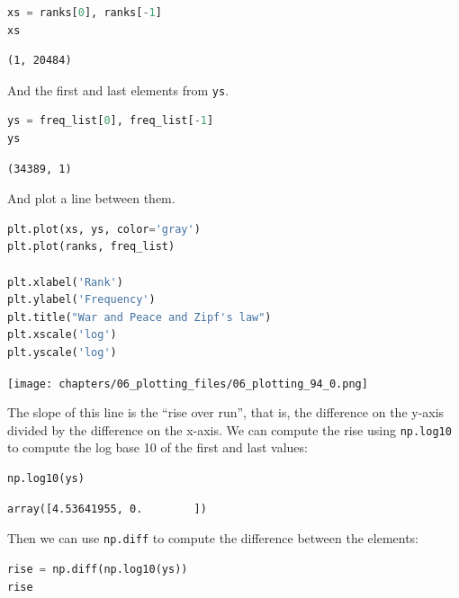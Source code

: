 \begin{lstlisting}[language=Python,style=source]
xs = ranks[0], ranks[-1]
xs
\end{lstlisting}

\begin{lstlisting}[style=output]
(1, 20484)
\end{lstlisting}

And the first and last elements from \passthrough{\lstinline!ys!}.

\begin{lstlisting}[language=Python,style=source]
ys = freq_list[0], freq_list[-1]
ys
\end{lstlisting}

\begin{lstlisting}[style=output]
(34389, 1)
\end{lstlisting}

And plot a line between them.

\begin{lstlisting}[language=Python,style=source]
plt.plot(xs, ys, color='gray')
plt.plot(ranks, freq_list)

plt.xlabel('Rank')
plt.ylabel('Frequency')
plt.title("War and Peace and Zipf's law")
plt.xscale('log')
plt.yscale('log')
\end{lstlisting}

\begin{center}
\texttt{[image: chapters/06\_plotting\_files/06\_plotting\_94\_0.png]}
\end{center}

The slope of this line is the ``rise over run'', that is, the difference
on the y-axis divided by the difference on the x-axis. We can compute
the rise using \passthrough{\lstinline!np.log10!} to compute the log
base 10 of the first and last values:

\begin{lstlisting}[language=Python,style=source]
np.log10(ys)
\end{lstlisting}

\begin{lstlisting}[style=output]
array([4.53641955, 0.        ])
\end{lstlisting}

Then we can use \passthrough{\lstinline!np.diff!} to compute the
difference between the elements:

\begin{lstlisting}[language=Python,style=source]
rise = np.diff(np.log10(ys))
rise
\end{lstlisting}


